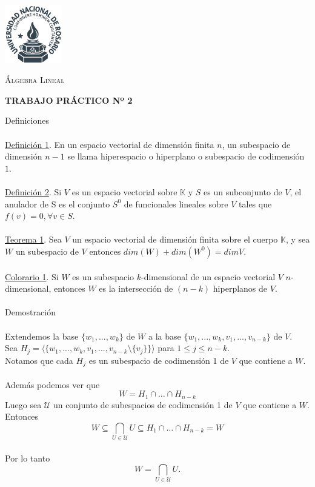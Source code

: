 \documentclass{article}
\begin{document}
\begin{titlepage}
	\centering
	\includegraphics[width=2.5cm]{unr.png}\par\vspace{1cm}
	{\scshape \fontsize{8}{4} \selectfont {FACULTAD DE CIENCIAS EXACTAS, INGENIERÍA Y AGRIMENSURA} \par}
	\vspace{1cm}
	{\scshape\Huge Álgebra Lineal\par}
	\vspace{1.5cm}
	{\Large \bfseries TRABAJO PRÁCTICO Nº 2\par}
\end{titlepage}
\fontsize{15}{15}\selectfont
\noindent
{\huge \colorbox[rgb]{0.54,0.81,0.94}{Definiciones}} \\ \\
\noindent
\underline{Definición 1}. En un espacio vectorial de dimensión finita $n$, un subespacio de
dimensión $n-1$ se llama hiperespacio o hiperplano o subespacio de codimensión $1$. \\ \\
\underline{Definición 2}. Si $V$ es un espacio vectorial sobre $\mathbb{K}$ y $S$ es un subconjunto
de $V$, el anulador de S es el conjunto $S^0$ de funcionales lineales sobre $V$ tales que 
$f(v) = 0, \forall v \in S$. \\ \\
\underline{Teorema 1}. Sea $V$ un espacio vectorial de dimensión finita sobre el cuerpo
$\mathbb{K}$, y sea $W$ un subespacio de $V$ entonces $dim(W) + dim(W^0) = dim V$. \\ \\
\underline{Colorario 1}. Si $W$ es un subespacio $k$-dimensional de un espacio vectorial $V$
$n$-dimensional, entonces $W$ es la intersección de $(n-k)$ hiperplanos de $V$. \\ \\
{\huge \colorbox[rgb]{0.54,0.81,0.94}{Demostración}} \\ \\
\noindent
Extendemos la base $\{w_1,...,w_k\}$ de $W$ a la base $\{w_1,...,w_k,v_1,...,v_{n-k}\}$ de $V$. \\
Sea $H_j = \langle \{ w_1,...,w_k,v_1,...,v_{n-k} \setminus \{ v_j \} \} \rangle$ para $1 \leq j \leq n-k$. \\
Notamos que cada $H_j$ es un subespacio de codimensión 1 de $V$ que contiene a $W$. \\ \\
Además podemos ver que
\[ W = H_1 \cap \dots \cap H_{n-k}\]
Luego sea $\mathcal{U}$ un conjunto de subespacios de codimensión 1 de $V$ que contiene a $W$. Entonces \\
\[W \subseteq \bigcap_{U \in \mathcal{U}}{U \subseteq H_1 \cap \dots \cap H_{n-k}} = W \] \\
Por lo tanto
\[ W = \bigcap_{U \in \mathcal{U}}{U}. \]
\end{document}
